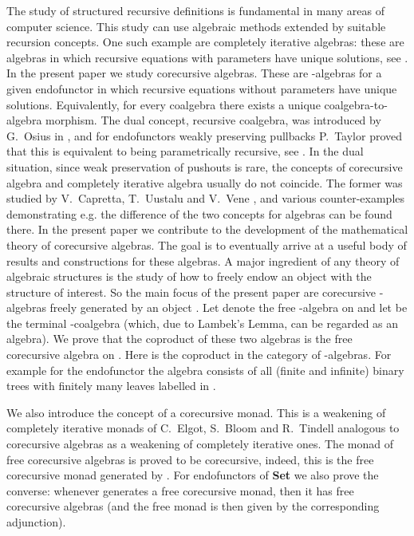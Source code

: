 \documentclass{LMCS}
\theoremstyle{plain}
\theoremstyle{definition}
\numberwithin{equation}{section}
\begin{document}
The study of structured recursive definitions is fundamental in many
areas of computer science. This study can use algebraic methods
extended by suitable recursion concepts. One such example are
completely iterative algebras: these are algebras in which recursive
equations with parameters have unique solutions, see \cite{m_cia}. In
the present paper we study corecursive algebras.  These are
-algebras for a given endofunctor  in which recursive equations
without parameters have unique solutions. Equivalently, for every
coalgebra there exists a unique coalgebra-to-algebra morphism. The
dual concept, recursive coalgebra, was introduced by G.~Osius in
\cite{g}, and for endofunctors weakly preserving pullbacks P.~Taylor
proved that this is equivalent to being parametrically recursive, see
\cite{t}. In the dual situation, since weak preservation of pushouts
is rare, the concepts of corecursive algebra and completely iterative
algebra usually do not coincide. The former was studied by
V.~Capretta, T.~Uustalu and V.~Vene \cite{cuv2}, and various
counter-examples demonstrating e.g. the difference of the two concepts
for algebras can be found there. In the present paper we contribute to
the development of the mathematical theory of corecursive
algebras. The goal is to eventually arrive at a useful body of results
and constructions for these algebras. A major ingredient of any theory
of algebraic structures is the study of how to freely endow an object
with the structure of interest. So the main focus of the present paper
are corecursive -algebras freely generated by an object . Let
 denote the free -algebra on  and let  be the terminal
-coalgebra (which, due to Lambek's Lemma, can be regarded as an
algebra). We prove that the coproduct of these two
algebras  is the free corecursive algebra on
. Here  is the coproduct in the category of
-algebras. For example for the endofunctor  the
algebra  consists of all (finite and infinite) binary trees with
finitely many leaves labelled in .

We also introduce the concept of a corecursive monad.  This is a
weakening of completely iterative monads of C.~Elgot, S.~Bloom and R.~Tindell \cite{ebt} 
analogous to corecursive algebras as a weakening of completely
iterative ones.  The monad  of free corecursive algebras
is proved to be corecursive, indeed, this is the free corecursive
monad generated by . For endofunctors of {\bf Set} we also prove
the converse: whenever  generates a free corecursive monad, then it
has free corecursive algebras (and the free monad is then given by the
corresponding adjunction).
\end{document}
